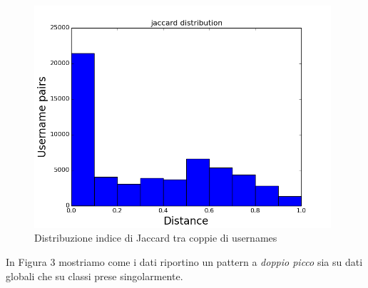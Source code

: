 \begin{figure}[bp!]
\centering
\includegraphics[width=110mm]{chapters/distanceplot/jaccard_distribution.png}
\caption{Distribuzione indice di Jaccard tra coppie di usernames \label{overflow}}
\end{figure}

\newpage

In Figura 3 mostriamo come i dati riportino un pattern a \textit{doppio picco} sia su dati globali che su classi prese singolarmente.


